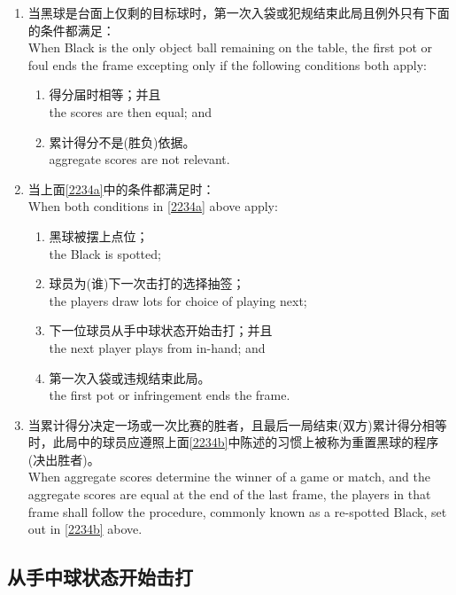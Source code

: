 \begin{enumerate}[label=(\alph*)]
    \item \label{2234a}当黑球是台面上仅剩的目标球时，第一次入袋或犯规结束此局且例外只有下面的条件都满足：\\
    When Black is the only object ball remaining on the table, the first pot or foul ends the frame excepting only if the following conditions both apply:
    \begin{enumerate}[label=(\roman*)]
        \item 得分届时相等；并且\\
        the scores are then equal; and
        \item 累计得分不是(胜负)依据。\\
        aggregate scores are not relevant.
    \end{enumerate}
    \item \label{2234b}当上面\ref{2234a}中的条件都满足时：\\
    When both conditions in \ref{2234a} above apply:
    \begin{enumerate}[label=(\roman*)]
        \item 黑球被摆上点位；\\
        the Black is spotted;
        \item 球员为(谁)下一次击打的选择抽签；\\
        the players draw lots for choice of playing next;
        \item 下一位球员从手中球状态开始击打；并且\\
        the next player plays from in-hand; and
        \item 第一次入袋或违规结束此局。\\
        the first pot or infringement ends the frame.
    \end{enumerate}
    \item 当累计得分决定一场或一次比赛的胜者，且最后一局结束(双方)累计得分相等时，此局中的球员应遵照上面\ref{2234b}中陈述的习惯上被称为重置黑球的程序(决出胜者)。\\
    When aggregate scores determine the winner of a game or match, and the aggregate scores are equal at the end of the last frame, the players in that frame shall follow the procedure, commonly known as a re-spotted Black, set out in \ref{2234b} above.
\end{enumerate}

\subsection{从手中球状态开始击打}

